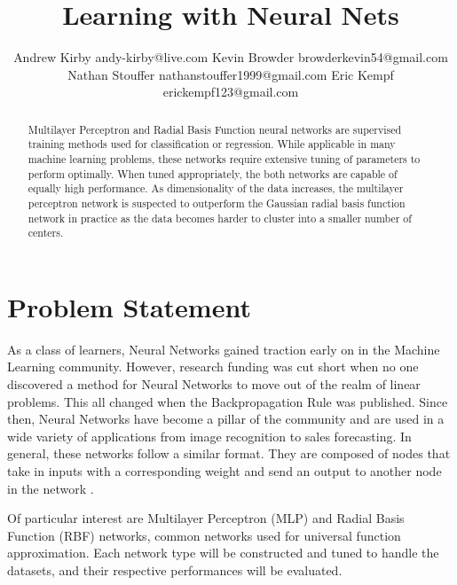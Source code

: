 \documentclass[twoside,10pt]{article}
\begin{document}
\title{Learning with Neural Nets}

\author{\name Andrew Kirby \email andy-kirby@live.com \AND
		\name Kevin Browder \email browderkevin54@gmail.com \AND
		\name Nathan Stouffer \email nathanstouffer1999@gmail.com \AND
		\name Eric Kempf \email erickempf123@gmail.com }

\maketitle

\begin{abstract}
Multilayer Perceptron and Radial Basis Function neural networks are supervised training methods used for classification or regression. While applicable in many machine learning problems, these networks require extensive tuning of parameters to perform optimally. When tuned appropriately, the both networks are capable of equally high performance. As dimensionality of the data increases, the multilayer perceptron network is suspected to outperform the Gaussian radial basis function network in practice as the data becomes harder to cluster into a smaller number of centers.
\end{abstract}

\section{Problem Statement}

As a class of learners, Neural Networks gained traction early on in the Machine Learning community. 
However, research funding was cut short when no one discovered a method for Neural Networks to move out of the realm of linear problems. This all changed when the Backpropagation Rule was published.
Since then, Neural Networks have become a pillar of the community and are used in a wide variety of applications from image recognition to sales forecasting.
In general, these networks follow a similar format. They are composed of nodes that take in inputs with a corresponding weight and send an output to another node in the network \citep{svozil1997ffnn}.

Of particular interest are Multilayer Perceptron (MLP) and Radial Basis Function (RBF) networks, common networks used for universal function approximation. 
Each network type will be constructed and tuned to handle the datasets, and their respective performances will be evaluated.
\end{document}
